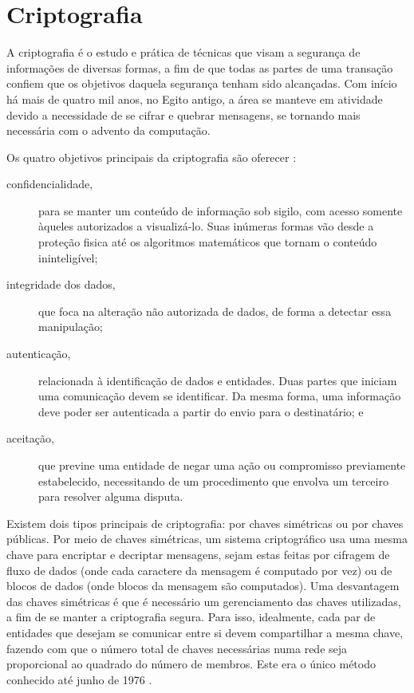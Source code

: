 
\section{Criptografia}

A criptografia é o estudo e prática de técnicas que visam a segurança de informações de
diversas formas, a fim de que todas as partes de uma transação confiem que os objetivos
daquela segurança tenham sido alcançadas. Com início há mais de quatro mil anos, no
Egito antigo, a área se manteve em atividade devido a necessidade de se cifrar e quebrar
mensagens, se tornando mais necessária com o advento da computação.

Os quatro objetivos principais da criptografia são oferecer \cite{book:applied-crypto}:

\begin{description}
    \item[confidencialidade,] para se manter um conteúdo de informação sob sigilo,
        com acesso somente àqueles autorizados a visualizá-lo. Suas inúmeras formas vão
        desde a proteção fisica até os algoritmos matemáticos que tornam o conteúdo
        ininteligível;

    \item[integridade dos dados,] que foca na alteração não autorizada de dados, de
        forma a detectar essa manipulação;

    \item[autenticação,] relacionada à identificação de dados e entidades. Duas partes
        que iniciam uma comunicação devem se identificar. Da mesma forma, uma
        informação deve poder ser autenticada a partir do envio para o destinatário; e

    \item[aceitação,] que previne uma entidade de negar uma ação ou compromisso
        previamente estabelecido, necessitando de um procedimento que envolva um
        terceiro para resolver alguma disputa.
\end{description}

Existem dois tipos principais de criptografia: por chaves simétricas ou por chaves
públicas. Por meio de chaves simétricas, um sistema criptográfico usa uma mesma chave
para encriptar e decriptar mensagens, sejam estas feitas por cifragem de fluxo de dados
(onde cada caractere da mensagem é computado por vez) ou de blocos de dados (onde blocos
da mensagem são computados). Uma desvantagem das chaves simétricas \cite{wiki:crypto} é
que é necessário um gerenciamento das chaves utilizadas, a fim de se manter a
criptografia segura. Para isso, idealmente, cada par de entidades que desejam se
comunicar entre si devem compartilhar a mesma chave, fazendo com que o número total de
chaves necessárias numa rede seja proporcional ao quadrado do número de membros. Este
era o único método conhecido até junho de 1976 \cite{artigo:diffiehellman}.

